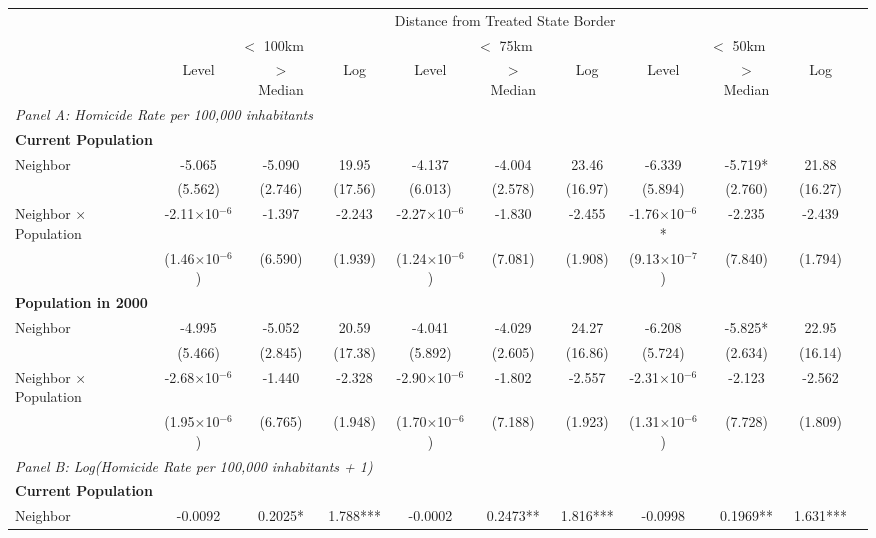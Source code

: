 \documentclass{article}
\begin{document}
\begin{table}[htbp]
\begin{adjustbox}{width=\textwidth}
\begin{tabular}{lcccccccccc}
\toprule
& \multicolumn{9}{c}{Distance from Treated State Border} \\
\cmidrule(lr){2-10}
& \multicolumn{3}{c}{$<$ 100km} & \multicolumn{3}{c}{$<$ 75km} & \multicolumn{3}{c}{$<$ 50km} \\
\cmidrule(lr){2-4} \cmidrule(lr){5-7} \cmidrule(lr){8-10}
& Level & $>$ Median & Log & Level & $>$ Median & Log & Level & $>$ Median & Log \\
\midrule
\multicolumn{10}{l}{\textit{Panel A: Homicide Rate per 100,000 inhabitants}} \\[0.5em]
\multicolumn{10}{l}{\textbf{Current Population}} \\[0.5em]
Neighbor & -5.065 & -5.090 & 19.95 & -4.137 & -4.004 & 23.46 & -6.339 & -5.719* & 21.88 \\
& (5.562) & (2.746) & (17.56) & (6.013) & (2.578) & (16.97) & (5.894) & (2.760) & (16.27) \\[0.5em]
Neighbor × Population & -2.11$\times$10$^{-6}$ & -1.397 & -2.243 & -2.27$\times$10$^{-6}$ & -1.830 & -2.455 & -1.76$\times$10$^{-6}$* & -2.235 & -2.439 \\
& (1.46$\times$10$^{-6}$) & (6.590) & (1.939) & (1.24$\times$10$^{-6}$) & (7.081) & (1.908) & (9.13$\times$10$^{-7}$) & (7.840) & (1.794) \\[1em]
\multicolumn{10}{l}{\textbf{Population in 2000}} \\[0.5em]
Neighbor & -4.995 & -5.052 & 20.59 & -4.041 & -4.029 & 24.27 & -6.208 & -5.825* & 22.95 \\
& (5.466) & (2.845) & (17.38) & (5.892) & (2.605) & (16.86) & (5.724) & (2.634) & (16.14) \\[0.5em]
Neighbor × Population & -2.68$\times$10$^{-6}$ & -1.440 & -2.328 & -2.90$\times$10$^{-6}$ & -1.802 & -2.557 & -2.31$\times$10$^{-6}$ & -2.123 & -2.562 \\
& (1.95$\times$10$^{-6}$) & (6.765) & (1.948) & (1.70$\times$10$^{-6}$) & (7.188) & (1.923) & (1.31$\times$10$^{-6}$) & (7.728) & (1.809) \\
\midrule
\multicolumn{10}{l}{\textit{Panel B: Log(Homicide Rate per 100,000 inhabitants + 1)}} \\[0.5em]
\multicolumn{10}{l}{\textbf{Current Population}} \\[0.5em]
Neighbor & -0.0092 & 0.2025* & 1.788*** & -0.0002 & 0.2473** & 1.816*** & -0.0998 & 0.1969** & 1.631*** \\

\end{tabular}
\end{adjustbox}
\end{table}
\end{document}
